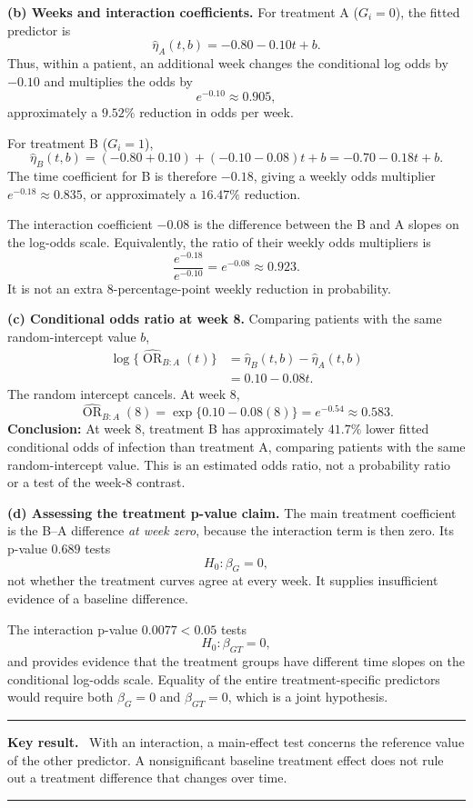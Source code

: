 \documentclass[11pt,a4paper]{article}
\newenvironment{keyresult}
  {\begin{center}\begin{minipage}{0.92\linewidth}\color{statblue}%
   \hrule\vspace{6pt}\textbf{Key result.}\ }
  {\vspace{6pt}\hrule\end{minipage}\end{center}}
\begin{document}
\textbf{(b) Weeks and interaction coefficients.}
For treatment A ($G_i=0$), the fitted predictor is
\[
\widehat\eta_A(t,b)=-0.80-0.10t+b.
\]
Thus, within a patient, an additional week changes the conditional log
odds by $-0.10$ and multiplies the odds by
\[
e^{-0.10}\approx0.905,
\]
approximately a $9.52\%$ reduction in odds per week.

For treatment B ($G_i=1$),
\[
\widehat\eta_B(t,b)
=(-0.80+0.10)+(-0.10-0.08)t+b
=-0.70-0.18t+b.
\]
The time coefficient for B is therefore $-0.18$, giving a weekly odds
multiplier $e^{-0.18}\approx0.835$, or approximately a $16.47\%$ reduction.

The interaction coefficient $-0.08$ is the difference between the B and A
slopes on the log-odds scale. Equivalently, the ratio of their weekly odds
multipliers is
\[
\frac{e^{-0.18}}{e^{-0.10}}=e^{-0.08}\approx0.923.
\]
It is not an extra $8$-percentage-point weekly reduction in probability.

\textbf{(c) Conditional odds ratio at week 8.}
Comparing patients with the same random-intercept value $b$,
\begin{align*}
\log\{\widehat{\operatorname{OR}}_{B:A}(t)\}
&=\widehat\eta_B(t,b)-\widehat\eta_A(t,b)\\
&=0.10-0.08t.
\end{align*}
The random intercept cancels. At week $8$,
\[
\boxed{
\widehat{\operatorname{OR}}_{B:A}(8)
=\exp\{0.10-0.08(8)\}=e^{-0.54}\approx0.583.
}
\]
\textbf{Conclusion:} At week 8, treatment B has approximately $41.7\%$
lower fitted conditional odds of infection than treatment A, comparing
patients with the same random-intercept value. This is an estimated odds
ratio, not a probability ratio or a test of the week-8 contrast.

\textbf{(d) Assessing the treatment p-value claim.}
The main treatment coefficient is the B--A difference \emph{at week zero},
because the interaction term is then zero. Its p-value $0.689$ tests
\[
H_0:\beta_G=0,
\]
not whether the treatment curves agree at every week. It supplies
insufficient evidence of a baseline difference.

The interaction p-value $0.0077<0.05$ tests
\[
H_0:\beta_{GT}=0,
\]
and provides evidence that the treatment groups have different time
slopes on the conditional log-odds scale. Equality of the entire
treatment-specific predictors would require both
$\beta_G=0$ and $\beta_{GT}=0$, which is a joint hypothesis.

\begin{keyresult}
With an interaction, a main-effect test concerns the reference value of
the other predictor. A nonsignificant baseline treatment effect does not
rule out a treatment difference that changes over time.
\end{keyresult}
\end{document}
